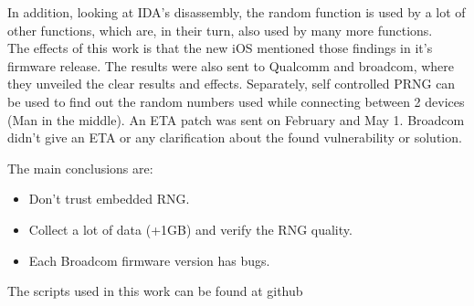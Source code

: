     In addition, looking at IDA’s disassembly, the random function is used by a lot of other functions, which are, in their turn, also used by many more functions.
    \\
    The effects of this work is that the new iOS mentioned those findings in it’s firmware release.
    The results were also sent to Qualcomm and broadcom, where they unveiled the clear results and effects.
    Separately, self controlled PRNG can be used to find out the random numbers used while connecting between 2 devices (Man in the middle).
    An ETA patch was sent on February and May 1.
    Broadcom didn’t give an ETA or any clarification about the found vulnerability or solution.
    
    The main conclusions are:
    \begin{itemize}
    \item Don’t trust embedded RNG.
    \item Collect a lot of data (+1GB) and verify the RNG quality.
    \item Each Broadcom firmware version has bugs.
    \end{itemize}
    The scripts used in this work can be found at \href{https://github.com/seemoo-lab/InternalBlue} github  